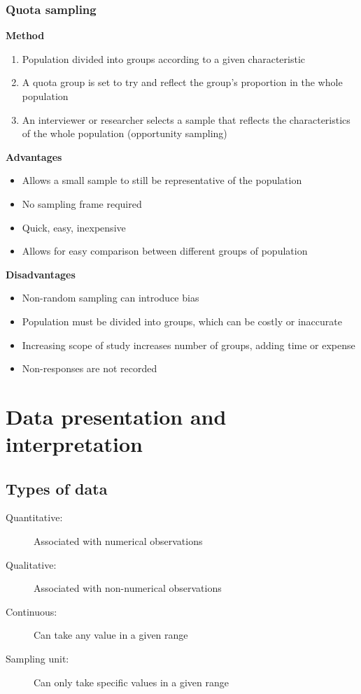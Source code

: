 \documentclass[A4paper]{article}
\begin{document}
	\subsubsection{Quota sampling}
	\textbf{Method}
	\begin{enumerate}
		\item Population divided into groups according to a given characteristic
		\item A quota group is set to try and reflect the group's proportion in the whole population
		\item An interviewer or researcher selects a sample that reflects the characteristics of the whole population (opportunity sampling)
	\end{enumerate}
	\textbf{Advantages}
	\begin{itemize}
		\item Allows a small sample to still be representative of the population
		\item No sampling frame required
		\item Quick, easy, inexpensive
		\item Allows for easy comparison between different groups of population
	\end{itemize}
	\textbf{Disadvantages}
	\begin{itemize}
		\item Non-random sampling can introduce bias
		\item Population must be divided into groups, which can be costly or inaccurate
		\item Increasing scope of study increases number of groups, adding time or expense
		\item Non-responses are not recorded
	\end{itemize}
	
	\pagebreak
	
	\section{Data presentation and interpretation}
	\subsection{Types of data}
	\begin{description}
		\item[Quantitative:] Associated with numerical observations
		\item[Qualitative:] Associated with non-numerical observations
		\item[Continuous:] Can take any value in a given range
		\item[Sampling unit:] Can only take specific values in a given range
	\end{description}
	
\end{document}
